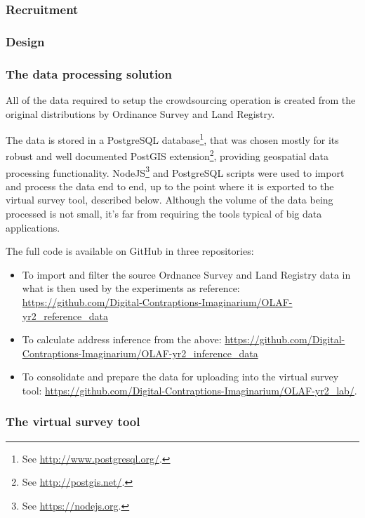     \subsubsection{Recruitment}
    \subsubsection{Design}
    \subsubsection{The data processing solution}

        All of the data required to setup the crowdsourcing operation is created from the original distributions by Ordinance Survey and Land Registry. 
        
        The data is stored in a PostgreSQL database\footnote{See \url{http://www.postgresql.org/}.}, that was chosen mostly for its robust and well documented PostGIS extension\footnote{See \url{http://postgis.net/}.}, providing geospatial data processing functionality. NodeJS\footnote{See \url{https://nodejs.org}.} and PostgreSQL scripts were used to import and process the data end to end, up to the point where it is exported to the virtual survey tool, described below. Although the volume of the data being processed is not small, it's far from requiring the tools typical of big data applications. 
        
        The full code is available on GitHub in three repositories:
        
        \begin{itemize}
            \item To import and filter the source Ordnance Survey and Land Registry data in what is then used by the experiments as reference: \url{https://github.com/Digital-Contraptions-Imaginarium/OLAF-yr2_reference_data}
            \item To calculate address inference from the above: \url{https://github.com/Digital-Contraptions-Imaginarium/OLAF-yr2_inference_data}
            \item To consolidate and prepare the data for uploading into the virtual survey tool: \url{https://github.com/Digital-Contraptions-Imaginarium/OLAF-yr2_lab/}.
        \end{itemize}

    \subsubsection{The virtual survey tool}
    
